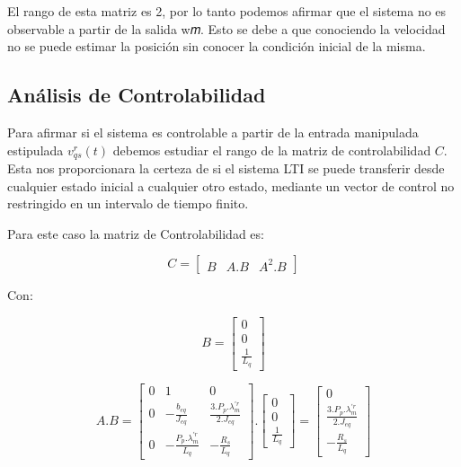 \documentclass{article}
\begin{document}
El rango de esta matriz es 2, por lo tanto podemos afirmar que el sistema no es observable a 
partir de la salida w𝑚. Esto se debe a que conociendo la velocidad no se puede estimar la 
posición sin conocer la condición inicial de la misma.


\subsection{Análisis de Controlabilidad}

Para afirmar si el sistema es controlable a partir de la entrada manipulada estipulada 
$v_{qs}^r(t)$ debemos estudiar el rango de la matriz de controlabilidad $C$. Esta nos 
proporcionara la certeza de si el sistema LTI se puede transferir desde cualquier estado inicial
a cualquier otro estado, mediante un vector de control no restringido en un intervalo de tiempo 
finito.

Para este caso la matriz de Controlabilidad es:

\begin{equation}
    C = 
    \begin{bmatrix}
        B & A.B & A^2.B
    \end{bmatrix}
\end{equation}

Con:

\begin{equation*}
    B = 
    \begin{bmatrix}
        0 \\
        0 \\
        \frac{1}{L_q}
    \end{bmatrix}
\end{equation*}

\begin{equation*}
    A.B = 
    \begin{bmatrix}
        0 & 1 & 0 \\
        0 & -\frac{b_{eq}}{J_{eq}} & \frac{3.P_p.\lambda_m^{\prime r}}{2.J_{eq}} \\
        0 & -\frac{P_p.\lambda_m^{\prime r}}{L_q} & -\frac{R_s}{L_q}
    \end{bmatrix}.
    \begin{bmatrix}
        0 \\
        0 \\
        \frac{1}{L_q}
    \end{bmatrix}
    =
    \begin{bmatrix}
        0 \\
        \frac{3.P_p.\lambda_m^{\prime r}}{2.J_{eq}} \\
        -\frac{R_s}{L_q}
    \end{bmatrix}
\end{equation*}
\end{document}
